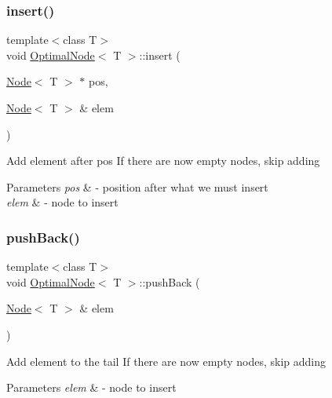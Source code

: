 \subsubsection{\texorpdfstring{insert()}{insert()}}
{\footnotesize\ttfamily template$<$class T$>$ \\
void \hyperlink{classOptimalList}{Optimal\+Node}$<$ T $>$\+::insert (\begin{DoxyParamCaption}\item[{\hyperlink{classList}{Node}$<$ T $>$ $\ast$}]{pos,  }\item[{\hyperlink{classList}{Node}$<$ T $>$ \&}]{elem }\end{DoxyParamCaption})\hspace{0.3cm}{\ttfamily [inline]}}

Add element after pos If there are now empty nodes, skip adding 
\begin{DoxyParams}{Parameters}
{\em pos} & -\/ position after what we must insert \\
\hline
{\em elem} & -\/ node to insert \\
\hline
\end{DoxyParams}
\mbox{\label{classOptimalList_aa7e86a832a4598304750fd3a0b0f9acb}} 
\subsubsection{\texorpdfstring{push\+Back()}{pushBack()}}
{\footnotesize\ttfamily template$<$class T$>$ \\
void \hyperlink{classOptimalList}{Optimal\+Node}$<$ T $>$\+::push\+Back (\begin{DoxyParamCaption}\item[{\hyperlink{classList}{Node}$<$ T $>$ \&}]{elem }\end{DoxyParamCaption})\hspace{0.3cm}{\ttfamily [inline]}}

Add element to the tail If there are now empty nodes, skip adding 
\begin{DoxyParams}{Parameters}
{\em elem} & -\/ node to insert \\
\hline
\end{DoxyParams}
\mbox{\label{classOptimalList_a5780692425a3653860f64cc59e26c657}} 
